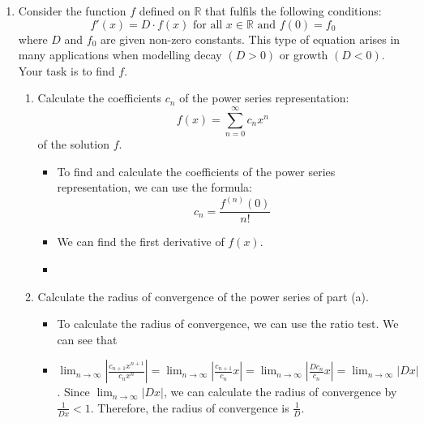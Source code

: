 \documentclass[12pt]{article}
\begin{document}
\begin{enumerate}[leftmargin=\labelsep]
    \item Consider the function $f$ defined on $\mathbb{R}$ that fulfils the following conditions:
    \begin{equation*}
        f'(x) = D \cdot f(x) \text{ for all } x \in \mathbb{R} \text{ and } f(0) = f_0
    \end{equation*}
    where $D$ and $f_0$ are given non-zero constants. This type of equation arises in many applications when modelling decay $(D>0)$ or growth $(D<0)$. Your task is to find $f$.
    
    
    \begin{enumerate}
        \item Calculate the coefficients $c_n$ of the power series representation:
        \begin{equation*}
            f(x) = \sum_{n=0}^{\infty} c_n x^n
        \end{equation*}
        of the solution $f$.
        \begin{itemize}[label={}]
            \item To find and calculate the coefficients of the power series representation, we can use the formula:
            \begin{equation*}
                c_n = \frac{f^{(n)}(0)}{n!}
            \end{equation*}
            \item We can find the first derivative of $f(x)$.
            \item 
        \end{itemize}


        \item Calculate the radius of convergence of the power series of part (a).
        \begin{itemize}[label={}]
            \item To calculate the radius of convergence, we can use the ratio test. We can see that
            \item $\displaystyle{\lim_{n \to \infty} \left| \frac{c_{n+1} x^{n+1}}{c_n x^n} \right| = \lim_{n \to \infty} \left| \frac{c_{n+1}}{c_n} x \right| = \lim_{n \to \infty} \left| \frac{D c_n}{c_n} x \right| = \lim_{n \to \infty} \left| D x \right|}$. Since $\displaystyle{\lim_{n \to \infty} \left| D x \right|}$, we can calculate the radius of convergence by $\displaystyle{\frac{1}{D x} < 1}$. Therefore, the radius of convergence is $\displaystyle{\frac{1}{D}}$.
        \end{itemize}


\end{enumerate}
\end{enumerate}
\end{document}
